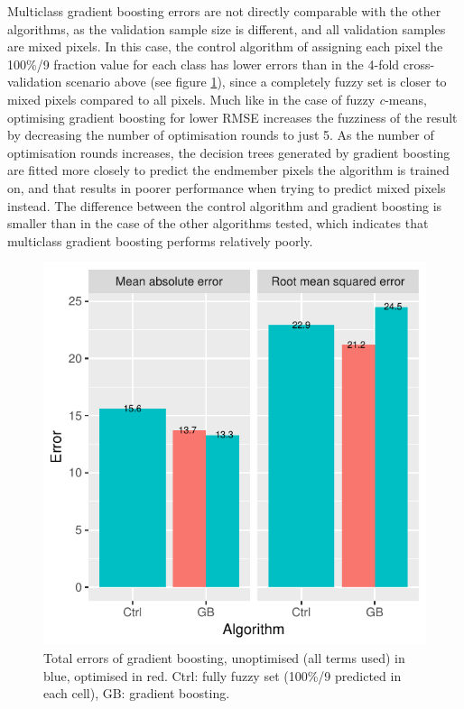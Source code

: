 \documentclass[a4paper,10pt]{book}
\begin{document}
Multiclass gradient boosting errors are not directly comparable with the other algorithms, as the validation sample size is different, and all validation samples are mixed pixels. In this case, the control algorithm of assigning each pixel the 100\%/9 fraction value for each class has lower errors than in the 4-fold cross-validation scenario above (see figure \ref{fig-total-errors-gb}), since a completely fuzzy set is closer to mixed pixels compared to all pixels. Much like in the case of fuzzy \textit{c}-means, optimising gradient boosting for lower RMSE increases the fuzziness of the result by decreasing the number of optimisation rounds to just 5. As the number of optimisation rounds increases, the decision trees generated by gradient boosting are fitted more closely to predict the endmember pixels the algorithm is trained on, and that results in poorer performance when trying to predict mixed pixels instead. The difference between the control algorithm and gradient boosting is smaller than in the case of the other algorithms tested, which indicates that multiclass gradient boosting performs relatively poorly.

\begin{figure}
  \centering
  \includegraphics{../plot/total-errors-gb}
  \caption{Total errors of gradient boosting, unoptimised (all terms used) in blue, optimised in red. Ctrl: fully fuzzy set (100\%/9 predicted in each cell), GB: gradient boosting.}
  \label{fig-total-errors-gb}
\end{figure}
\end{document}
